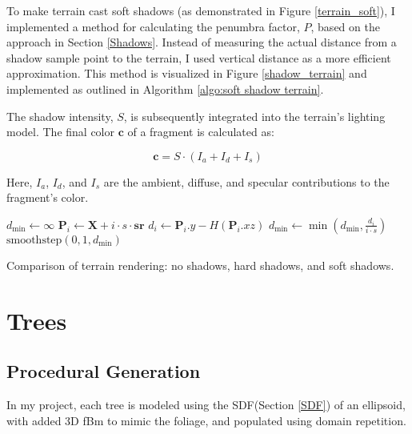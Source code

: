 To make terrain cast soft shadows (as demonstrated in Figure \ref{terrain_soft}), I implemented a method for calculating the penumbra factor, $P$, based on the approach in Section \ref{Shadows}. Instead of measuring the actual distance from a shadow sample point to the terrain, I used vertical distance as a more efficient approximation. This method is visualized in Figure \ref{shadow_terrain} and implemented as outlined in Algorithm \ref{algo:soft shadow terrain}.

The shadow intensity, $S$, is subsequently integrated into the terrain's lighting model. The final color $\mathbf{c}$ of a fragment is calculated as:

\begin{equation}
    \mathbf{c} = S \cdot (I_{a} + I_{d} + I_{s})
\end{equation}

Here, $I_{a}$, $I_{d}$, and $I_{s}$ are the ambient, diffuse, and specular contributions to the fragment's color.



\begin{algorithm}
\caption{Terrain Shadow Calculation}
\label{algo:soft shadow terrain}
\begin{algorithmic}
    \State $d_{\text{min}} \gets \infty$
        \State $\mathbf{P}_i \gets \mathbf{X} + i \cdot s \cdot \mathbf{sr}$
        \State $d_i \gets \mathbf{P}_i.y - H(\mathbf{P}_i.xz)$
        \State $d_{\text{min}} \gets \min(d_{\text{min}}, \frac{d_i}{i \cdot s})$
    \EndFor
    \State \Return $\text{smoothstep}(0, 1, d_{\text{min}})$
\EndFunction
\end{algorithmic}
\end{algorithm}

{Comparison of terrain rendering: no shadows, hard shadows, and soft shadows.}

\section{Trees}

\subsection{Procedural Generation}
\label{Tree Procedural Generation}

In my project, each tree is modeled using the SDF(Section \ref{SDF}) of an ellipsoid, with added 3D fBm to mimic the foliage, and populated using domain repetition. 

